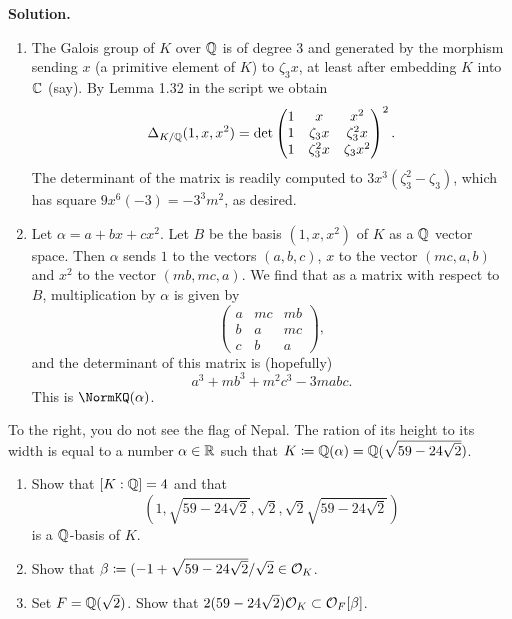 \documentclass[a4paper,11pt]{article}
\begin{document}
\textbf{Solution.} 
\begin{enumerate}
    \item The Galois group of $K$ over $\mathbb{Q}$ is of degree $3$ and generated by the 
        morphism sending $x$ (a primitive element of $K$) to $\zeta_3 x$, at least 
        after embedding $K$ into $\mathbb{C}$ (say). By Lemma 1.32 in the script we obtain
        \begin{equation*}
            \Delta_{K/\mathbb{Q}}(1,x,x^2) = \det \begin{pmatrix}
                                            1 & x & x^2 \\
                                            1 & \zeta_3 x & \zeta_3^2 x \\
                                            1 & \zeta_3^2 x & \zeta_3 x^2
                                          \end{pmatrix}^2.
        \end{equation*}
        The determinant of the matrix is readily computed to $3x^3(\zeta_3^2 - 
        \zeta_3)$, which has square $9x^6(-3) = -3^3m^2$, as desired.

    \item Let $\alpha = a + bx + cx^2$. Let $B$ be the basis $(1,x,x^2)$ of $K$
        as a $\mathbb{Q}$ vector space. Then $\alpha$ sends $1$ to the vectors
        $(a,b,c)$, $x$ to the vector $(mc, a, b)$ and $x^2$ to the vector
        $(mb, mc, a)$. We find that as a matrix with respect to $B$, 
        multiplication by $\alpha$ is given by
        \begin{equation*}
            \begin{pmatrix} 
                a  & mc & mb \\
                b  & a  & mc  \\
                c  & b  & a
            \end{pmatrix},
        \end{equation*}
        and the determinant of this matrix is (hopefully)
        \begin{equation*}
            a^3 + mb^3 + m^2 c^3 - 3mabc.
        \end{equation*}
        This is $\NormKQ(\alpha)$.
\end{enumerate}

To the right, you do not see the flag of Nepal. The ration of its height to its 
width is equal to a number $\alpha \in \mathbb{R}$ such that $K \coloneqq \mathbb{Q}(\alpha)
= \mathbb{Q}(\sqrt{59-24\sqrt 2})$.
\begin{enumerate}
    \item Show that $[K:\mathbb{Q}]=4$ and that 
        \begin{equation*}
            \left(1, \sqrt{59 - 24\sqrt 2}, \sqrt 2, \sqrt2 \sqrt{59- 24\sqrt 2}
                \right)
        \end{equation*}
        is a $\mathbb{Q}$-basis of $K$.
    \item Show that $\beta \coloneqq (-1 + \sqrt{59 - 24\sqrt 2}/\sqrt 2 \in \mathcal{O}_K$. 
    \item Set $F = \mathbb{Q}(\sqrt 2)$. Show that $2(59- 24\sqrt 2) \mathcal{O}_K \subset
        \mathcal{O}_F[\beta]$. 
\end{enumerate}
\end{document}
